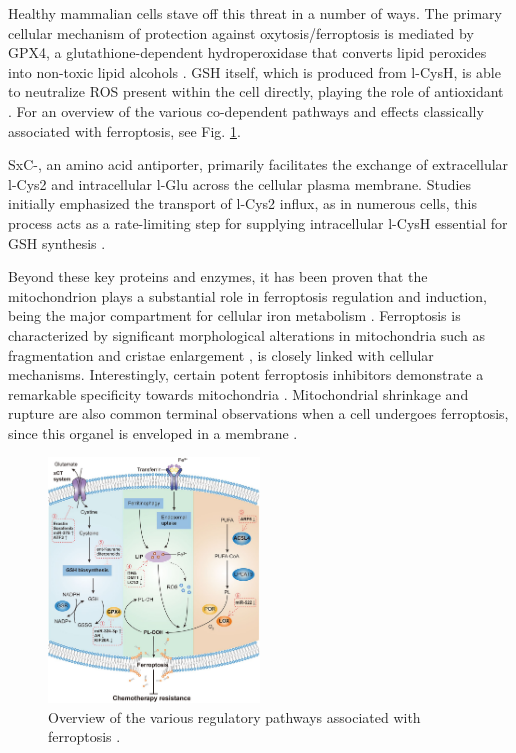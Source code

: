 Healthy mammalian cells stave off this threat in a number of ways. The primary cellular mechanism of protection against oxytosis/ferroptosis is mediated by \ac{GPX4}, a glutathione-dependent hydroperoxidase that converts lipid peroxides into non-toxic lipid alcohols \citep{gpx4}. \ac{GSH} itself, which is produced from \ac{l-CysH}, is able to neutralize \ac{ROS} present within the cell directly, playing the role of antioxidant \citep{glutath}. For an overview of the various co-dependent pathways and effects classically associated with ferroptosis, see Fig. \ref{fig:ferro_mech}.

\ac{SxC-}, an amino acid antiporter, primarily facilitates the exchange of extracellular \ac{l-Cys2} and intracellular \ac{l-Glu} across the cellular plasma membrane. Studies initially emphasized the transport of \ac{l-Cys2} influx, as in numerous cells, this process acts as a rate-limiting step for supplying intracellular \ac{l-CysH} essential for \ac{GSH} synthesis \citep{sxc-}.


Beyond these key proteins and enzymes, it has been proven that the mitochondrion plays a substantial role in ferroptosis regulation and induction, being the major compartment for cellular iron metabolism \citep{mito_ferro2}. Ferroptosis is characterized by significant morphological alterations in mitochondria such as fragmentation and cristae enlargement \citep{mito_ferro3}, is closely linked with cellular mechanisms. Interestingly, certain potent ferroptosis inhibitors demonstrate a remarkable specificity towards mitochondria \citep{mito_ferro4}. Mitochondrial shrinkage and rupture are also common terminal observations when a cell undergoes ferroptosis, since this organel is enveloped in a membrane \citep{mito_ferro}.

\begin{figure}[ht]
	\begin{center}
		\includegraphics[width = 0.5\textwidth]{Fig/ferroptosis.png}
		\end{center}
		\caption{Overview of the various regulatory pathways associated with ferroptosis \citep{ferro_cancer}.}\label{fig:ferro_mech}
\end{figure}


